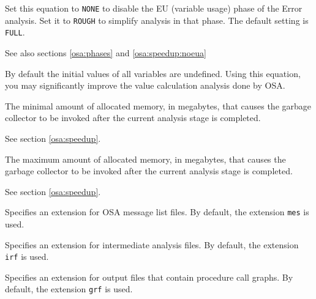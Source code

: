 \begin{description}
        Set this equation to \verb'NONE' to disable the EU (variable usage)
        phase of the Error analysis. Set it to \verb'ROUGH' to simplify 
        analysis in that phase. The default setting is \verb'FULL'.

        See also sections \ref{osa:phases} and \ref{osa:speedup:noeua}



        By default the initial values of all variables are undefined. 
        Using this equation, you may significantly improve
        the value calculation analysis done by OSA.


        The minimal amount of allocated memory, in megabytes, that
        causes the garbage collector to be invoked after the current
        analysis stage is completed.

        See section \ref{osa:speedup}. 


        The maximum amount of allocated memory, in megabytes, that
        causes the garbage collector to be invoked after the current
        analysis stage is completed.

        See section \ref{osa:speedup}. 


        Specifies an extension for OSA message list files.
        By default, the extension \verb'mes' is used.


        Specifies an extension for intermediate analysis files.
        By default, the extension \verb'irf' is used.


        Specifies an extension for output files that contain
        procedure call graphs.
        By default, the extension \verb'grf' is used.

\ifonline \else
\end{description}
\fi

